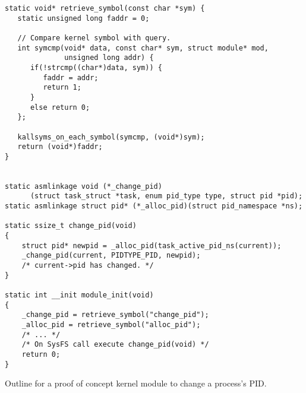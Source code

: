 \documentclass[a4paper,12pt,twoside,openright]{report}
\begin{document}
\begin{listing}[h]
\begin{verbatim}
static void* retrieve_symbol(const char *sym) { 
   static unsigned long faddr = 0;  

   // Compare kernel symbol with query.
   int symcmp(void* data, const char* sym, struct module* mod, 
              unsigned long addr) { 
      if(!strcmp((char*)data, sym)) { 
         faddr = addr; 
         return 1; 
      } 
      else return 0; 
   }; 

   kallsyms_on_each_symbol(symcmp, (void*)sym); 
   return (void*)faddr; 
} 


static asmlinkage void (*_change_pid)
      (struct task_struct *task, enum pid_type type, struct pid *pid);
static asmlinkage struct pid* (*_alloc_pid)(struct pid_namespace *ns);

static ssize_t change_pid(void)
{
    struct pid* newpid = _alloc_pid(task_active_pid_ns(current));
    _change_pid(current, PIDTYPE_PID, newpid);
    /* current->pid has changed. */
}

static int __init module_init(void)
{
    _change_pid = retrieve_symbol("change_pid");
    _alloc_pid = retrieve_symbol("alloc_pid");
    /* ... */
    /* On SysFS call execute change_pid(void) */
    return 0;
}

\end{verbatim}
\caption{Outline for a proof of concept kernel module to change a process's PID.}
\end{listing}

 
 

\end{document}
